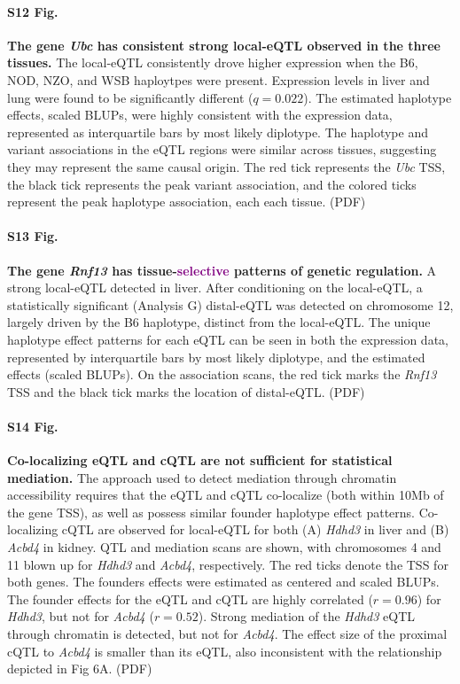 \documentclass[10pt,letterpaper]{article}
\newcommand{\TFinline}[1]{\textcolor{purple}{#1}}
\begin{document}
\paragraph*{S12 Fig.}
\label{S_ubc_correlated_eqtl}
{\bf The gene \textit{Ubc} has consistent strong local-eQTL observed in the three tissues.}
The local-eQTL consistently drove higher expression when the B6, NOD, NZO, and WSB haploytpes were present. Expression levels in liver and lung were found to be significantly different ($q = 0.022$). The estimated haplotype effects, scaled BLUPs, were highly consistent with the expression data, represented as interquartile bars by most likely diplotype. The haplotype and variant associations in the eQTL regions were similar across tissues, suggesting they may represent the same causal origin. The red tick represents the \textit{Ubc} TSS, the black tick represents the peak variant association, and the colored ticks represent the peak haplotype association, each each tissue. (PDF)

\paragraph*{S13 Fig.}
\label{S_rnf13_distal_eqtl}
{\bf The gene \textit{Rnf13} has tissue-\TFinline{selective} patterns of genetic regulation.}
A strong local-eQTL detected in liver. After conditioning on the local-eQTL, a statistically significant (Analysis G) distal-eQTL was detected on chromosome 12, largely driven by the B6 haplotype, distinct from the local-eQTL. The unique haplotype effect patterns for each eQTL can be seen in both the expression data, represented by interquartile bars by most likely diplotype, and the estimated effects (scaled BLUPs). On the association scans, the red tick marks the \textit{Rnf13} TSS and the black tick marks the location of distal-eQTL. (PDF)

\paragraph*{S14 Fig.}
\label{S_colocalization}
{\bf Co-localizing eQTL and cQTL are not sufficient for statistical mediation.}
The approach used to detect mediation through chromatin accessibility requires that the eQTL and cQTL co-localize (both within 10Mb of the gene TSS), as well as possess similar founder haplotype effect patterns. Co-localizing cQTL are observed for local-eQTL for both (A) \textit{Hdhd3} in liver and (B) \textit{Acbd4} in kidney. QTL and mediation scans are shown, with chromosomes 4 and 11 blown up for \textit{Hdhd3} and \textit{Acbd4}, respectively. The red ticks denote the TSS for both genes. The founders effects were estimated as centered and scaled BLUPs. The founder effects for the eQTL and cQTL are highly correlated ($r = 0.96$) for \textit{Hdhd3}, but not for \textit{Acbd4} ($r = 0.52$). Strong mediation of the \textit{Hdhd3} eQTL through chromatin is detected, but not for \textit{Acbd4}. The effect size of the proximal cQTL to \textit{Acbd4} is smaller than its eQTL, also inconsistent with the relationship depicted in Fig 6A. (PDF)
\end{document}
